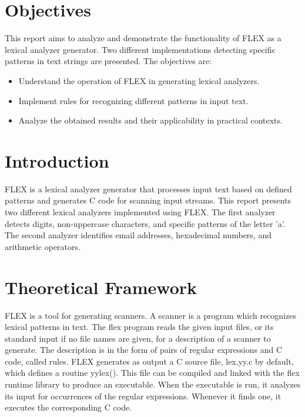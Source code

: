 \documentclass[a4paper,11pt]{scrarticle}
\begin{document}
    \newpage
    \tableofcontents
    \newpage

    \section{Objectives}
    This report aims to analyze and demonstrate the functionality of FLEX as a lexical analyzer generator. Two different implementations detecting specific patterns in text strings are presented. The objectives are:
    \begin{itemize}
        \item Understand the operation of FLEX in generating lexical analyzers.
        \item Implement rules for recognizing different patterns in input text.
        \item Analyze the obtained results and their applicability in practical contexts.
    \end{itemize}

        \section{Introduction}
    FLEX is a lexical analyzer generator that processes input text based on defined patterns and generates C code for scanning input streams. This report presents two different lexical analyzers implemented using FLEX. The first analyzer detects digits, non-uppercase characters, and specific patterns of the letter 'a'. The second analyzer identifies email addresses, hexadecimal numbers, and arithmetic operators.

    \section{Theoretical Framework}
    FLEX is a tool for generating scanners. A scanner is a program which recognizes lexical patterns in text. The flex program reads the given input files, or its standard input if no file names are given, for a description of a scanner to generate. The description is in the form of pairs of regular expressions and C code, called rules. FLEX generates as output a C source file, lex.yy.c by default, which defines a routine yylex(). This file can be compiled and linked with the flex runtime library to produce an executable. When the executable is run, it analyzes its input for occurrences of the regular expressions. Whenever it finds one, it executes the corresponding C code.
    \cite{flex_manual}
\end{document}
